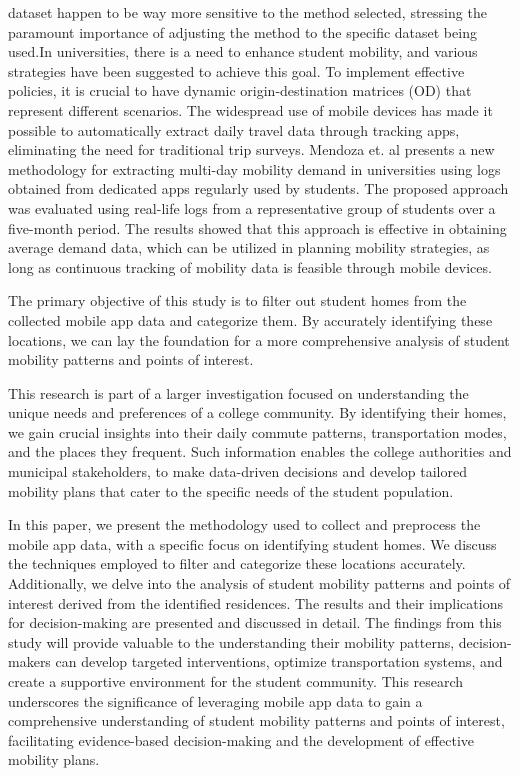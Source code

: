 \documentclass[]{elsarticle} %
\begin{document}
dataset happen to be way more sensitive to the method selected,
stressing the paramount importance of adjusting the method to the
specific dataset being used.In universities, there is a need to enhance
student mobility, and various strategies have been suggested to achieve
this goal. To implement effective policies, it is crucial to have
dynamic origin-destination matrices (OD) that represent different
scenarios. The widespread use of mobile devices has made it possible to
automatically extract daily travel data through tracking apps,
eliminating the need for traditional trip surveys. Mendoza et. al
\citep{mendoza2020automatic} presents a new methodology for extracting
multi-day mobility demand in universities using logs obtained from
dedicated apps regularly used by students. The proposed approach was
evaluated using real-life logs from a representative group of students
over a five-month period. The results showed that this approach is
effective in obtaining average demand data, which can be utilized in
planning mobility strategies, as long as continuous tracking of mobility
data is feasible through mobile devices.

The primary objective of this study is to filter out student homes from
the collected mobile app data and categorize them. By accurately
identifying these locations, we can lay the foundation for a more
comprehensive analysis of student mobility patterns and points of
interest.

This research is part of a larger investigation focused on understanding
the unique needs and preferences of a college community. By identifying
their homes, we gain crucial insights into their daily commute patterns,
transportation modes, and the places they frequent. Such information
enables the college authorities and municipal stakeholders, to make
data-driven decisions and develop tailored mobility plans that cater to
the specific needs of the student population.

In this paper, we present the methodology used to collect and preprocess
the mobile app data, with a specific focus on identifying student homes.
We discuss the techniques employed to filter and categorize these
locations accurately. Additionally, we delve into the analysis of
student mobility patterns and points of interest derived from the
identified residences. The results and their implications for
decision-making are presented and discussed in detail. The findings from
this study will provide valuable to the understanding their mobility
patterns, decision-makers can develop targeted interventions, optimize
transportation systems, and create a supportive environment for the
student community. This research underscores the significance of
leveraging mobile app data to gain a comprehensive understanding of
student mobility patterns and points of interest, facilitating
evidence-based decision-making and the development of effective mobility
plans.
\end{document}
